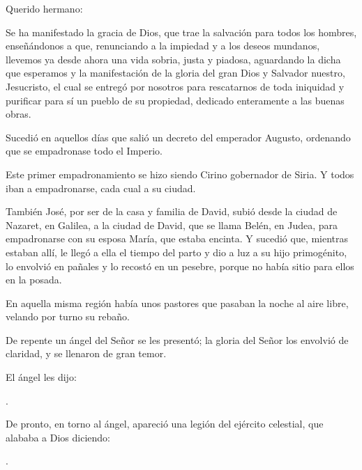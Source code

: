 
 


\begin{scripture}
	
	Querido hermano:
	
	Se ha manifestado la gracia de Dios, que trae la salvación para todos los hombres, enseñándonos a que, renunciando a la impiedad y a los deseos mundanos, llevemos ya desde ahora una vida sobria, justa y piadosa, aguardando la dicha que esperamos y la manifestación de la gloria del gran Dios y Salvador nuestro, Jesucristo, el cual se entregó por nosotros para rescatarnos de toda iniquidad y purificar para sí un pueblo de su propiedad, dedicado enteramente a las buenas obras.
\end{scripture}


 


\begin{scripture}
	Sucedió en aquellos días que salió un decreto del emperador Augusto, ordenando que se empadronase todo el Imperio.
	
	Este primer empadronamiento se hizo siendo Cirino gobernador de Siria. Y todos iban a empadronarse, cada cual a su ciudad.
	
	También José, por ser de la casa y familia de David, subió desde la ciudad de Nazaret, en Galilea, a la ciudad de David, que se llama Belén, en Judea, para empadronarse con su esposa María, que estaba encinta. Y sucedió que, mientras estaban allí, le llegó a ella el tiempo del parto y dio a luz a su hijo primogénito, lo envolvió en pañales y lo recostó en un pesebre, porque no había sitio para ellos en la posada.
	
	En aquella misma región había unos pastores que pasaban la noche al aire libre, velando por turno su rebaño.
	
	De repente un ángel del Señor se les presentó; la gloria del Señor los envolvió de claridad, y se llenaron de gran temor.
	
	El ángel les dijo:
	
	.
	
	De pronto, en torno al ángel, apareció una legión del ejército celestial, que alababa a Dios diciendo: 
	
	.
\end{scripture}

